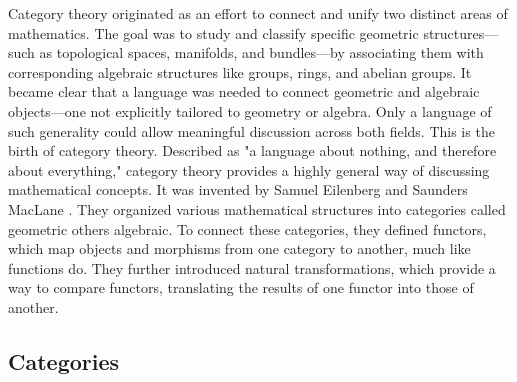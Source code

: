 Category theory originated as an effort to connect and unify two distinct areas of mathematics.  The goal was to study and classify specific geometric structures—such as topological spaces, manifolds, and bundles—by associating them with corresponding algebraic structures like groups, rings, and abelian groups. It became clear that a language was needed to connect geometric and algebraic objects—one not explicitly tailored to geometry or algebra. Only a language of such generality could allow meaningful discussion across both fields.  This is the birth of category theory.
Described as "a language about nothing, and therefore about everything," category theory provides a highly general way of discussing mathematical concepts.  It was invented by Samuel Eilenberg and Saunders MacLane \cite{eilenbergGeneralTheoryNatural1945}. They organized various mathematical structures into categories called geometric others algebraic. To connect these categories, they defined functors, which map objects and morphisms from one category to another, much like functions do. They further introduced natural transformations, which provide a way to compare functors, translating the results of one functor into those of another. \cite{yanofskyMonoidalCategoryTheory2024}


\subsection{Categories}

